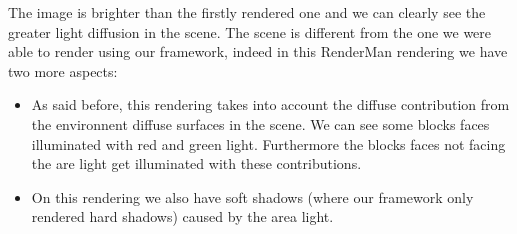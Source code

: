 \documentclass[a4,12pt]{article}
\begin{document}
	The image is brighter than the firstly rendered one and we can clearly see the greater light diffusion in the scene. The scene is different from the one we were able to render using our framework, indeed in this RenderMan rendering we have two more aspects:
	\begin{itemize}
		\item As said before, this rendering takes into account the diffuse contribution from the environnent diffuse surfaces in the scene. We can see some blocks faces illuminated with red and green light. Furthermore the blocks faces not facing the are light get illuminated with these contributions.
		\item On this rendering we also have soft shadows (where our framework only rendered hard shadows) caused by the area light.
	\end{itemize}
	
\end{document}
